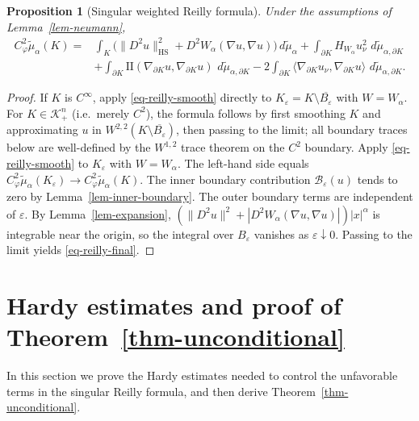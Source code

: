 \documentclass[12pt,leqno]{amsart}
\theoremstyle{plain} \newtheorem{thm}{Theorem}[section]
\theoremstyle{plain} \newtheorem{prop}[thm]{Proposition}
\theoremstyle{plain} \newtheorem{prob}[thm]{Problem}
\theoremstyle{definition} \newtheorem{defi}[thm]{Definition}
\theoremstyle{plain} \newtheorem{cor}[thm]{Corollary}
\theoremstyle{plain} \newtheorem{lem}[thm]{Lemma}
\theoremstyle{plain} \newtheorem{eg}{Example}[section]
\theoremstyle{remark} \newtheorem{rmk}[thm]{Remark}
\theoremstyle{plain} \newtheorem{conj}{Conjecture}
\numberwithin{equation}{section}
\newcommand{\dd}{\,d}
\newcommand{\HS}{\mathrm{HS}}
\begin{document}
\begin{prop}[Singular weighted Reilly formula]
  \label{prop-singular-reilly}
  Under the assumptions of Lemma~\ref{lem-neumann},
  \begin{equation}\label{eq-reilly-final}
    \begin{aligned}
      C_\varphi^2\tilde{\mu}_\alpha(K)
      =&\int_K\bigl(\|D^2u\|_{\HS}^2
         +D^2W_\alpha(\nabla u,\nabla u)\bigr)
         \dd\tilde{\mu}_\alpha
       +\int_{\partial K}H_{W_\alpha}u_\nu^2
         \,\dd\tilde{\mu}_{\alpha,\partial K}\\
       &+\int_{\partial K}\mathrm{II}(\nabla_{\partial K}u,
         \nabla_{\partial K}u)
         \,\dd\tilde{\mu}_{\alpha,\partial K}
       -2\int_{\partial K}
         \langle\nabla_{\partial K}u_\nu,
         \nabla_{\partial K}u\rangle
         \,\dd\tilde{\mu}_{\alpha,\partial K}.
    \end{aligned}
  \end{equation}
\end{prop}

\begin{proof}
  If $K$ is $C^\infty$, apply \eqref{eq-reilly-smooth} directly to
  $K_\varepsilon=K\setminus\overline{B_\varepsilon}$ with $W=W_\alpha$.
  For $K\in\mathcal{K}_+^n$ (i.e.\ merely $C^2$), the formula follows by
  first smoothing $K$ and approximating $u$ in
  $W^{2,2}(K\setminus\overline{B_\varepsilon})$, then passing to the
  limit; all boundary traces below are well-defined by the
  $W^{1,2}$ trace theorem on the $C^2$ boundary. Apply \eqref{eq-reilly-smooth} to $K_\varepsilon$ with
  $W=W_\alpha$. The left-hand side equals \(C_\varphi^2\tilde{\mu}_\alpha(K_\varepsilon)
    \to
    C_\varphi^2\tilde{\mu}_\alpha(K).\)
  The inner boundary contribution $\mathcal B_\varepsilon(u)$ tends to zero by Lemma~\ref{lem-inner-boundary}. The outer boundary terms are
  independent of $\varepsilon$. By Lemma~\ref{lem-expansion}, $(\|D^2u\|^2+|D^2W_\alpha(\nabla u,\nabla u)|)|x|^\alpha$ is integrable near the origin, so the integral over
  $B_\varepsilon$ vanishes as $\varepsilon\downarrow0$. Passing to the
  limit yields \eqref{eq-reilly-final}.
\end{proof}


\section{Hardy estimates and proof of Theorem~\ref{thm-unconditional}}
\label{sec-unconditional-proof}

In this section we prove the Hardy estimates needed to control the
unfavorable terms in the singular Reilly formula, and then
derive Theorem~\ref{thm-unconditional}. 
\end{document}
